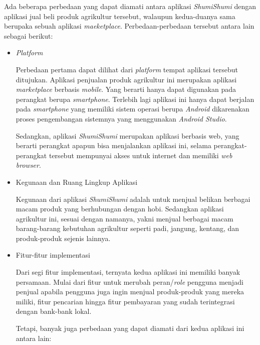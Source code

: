 \documentclass[a4paper]{article}
\begin{document}
\begin{enumerate}
    Ada beberapa perbedaan yang dapat diamati antara aplikasi \textit{ShumiShumi} dengan aplikasi jual beli produk agrikultur tersebut, walaupun kedua-duanya sama berupaka sebuah aplikasi \textit{maeketplace}. Perbedaan-perbedaan tersebut antara lain sebagai berikut:

    \begin{itemize}
        \item \textit{Platform}

        Perbedaan pertama dapat dilihat dari \textit{platform} tempat aplikasi tersebut ditujukan. Aplikasi penjualan produk agrikultur ini merupakan aplikasi \textit{marketplace} berbasis \textit{mobile}. Yang berarti hanya dapat digunakan pada perangkat berupa \textit{smartphone}. Terlebih lagi aplikasi ini hanya dapat berjalan pada \textit{smartphone} yang memiliki sistem operasi berupa \textit{Android} dikarenakan proses pengembangan sistemnya yang menggunakan \textit{Android Studio}\autocite{agriculture-marketplace}.

        Sedangkan, aplikasi \textit{ShumiShumi} merupakan aplikasi berbasis web, yang berarti perangkat apapun bisa menjalankan aplikasi ini, selama perangkat-perangkat tersebut mempunyai akses untuk internet dan memiliki \textit{web browser}.

        \item Kegunaan dan Ruang Lingkup Aplikasi

        Kegunaan dari aplikasi \textit{ShumiShumi} adalah untuk menjual belikan berbagai macam produk yang berhubungan dengan hobi. Sedangkan aplikasi agrikultur ini, sesuai dengan namanya, yakni menjual berbagai macam barang-barang kebutuhan agrikultur seperti padi, jangung, kentang, dan produk-produk sejenis lainnya\autocite{agriculture-marketplace}.

        \item Fitur-fitur implementasi

        Dari segi fitur implementasi, ternyata kedua aplikasi ini memiliki banyak persamaan. Mulai dari fitur untuk merubah peran/\textit{role} pengguna menjadi penjual apabila pengguna juga ingin menjual produk-produk yang mereka miliki, fitur pencarian hingga fitur pembayaran yang sudah terintegrasi dengan bank-bank lokal.

        Tetapi, banyak juga perbedaan yang dapat diamati dari kedua aplikasi ini antara lain:


\end{itemize}
\end{enumerate}
\end{document}
